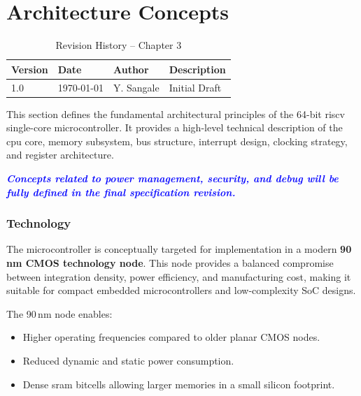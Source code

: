 
\chapter{Architecture Concepts}
\label{chap:architecture_concepts}

\begin{table}[H]
\caption{Revision History – Chapter 3}
\centering
\begin{tabular}{llll}
\toprule
Version & Date & Author & Description \\
\midrule
1.0 & \today & Y. Sangale & Initial Draft \\
\bottomrule
\end{tabular}
\end{table}

This section defines the fundamental architectural principles of the 64-bit \gls{riscv} single-core microcontroller. It provides a high-level technical description of the \gls{cpu} core, memory subsystem, bus structure, interrupt design, clocking strategy, and register architecture. 

\textcolor{blue}{\textbf{\textit{Concepts related to power management, security, and debug will be fully defined in the final specification revision.}}}

\subsection{Technology}

The microcontroller is conceptually targeted for implementation in a modern \textbf{90\,nm CMOS technology node}. 
This node provides a balanced compromise between integration density, power efficiency, and manufacturing cost, 
making it suitable for compact embedded microcontrollers and low-complexity \gls{SoC} designs.

The 90\,nm node enables:
\begin{itemize}
  \item Higher operating frequencies compared to older planar CMOS nodes.
  \item Reduced dynamic and static power consumption.
  \item Dense \gls{sram} bitcells allowing larger memories in a small silicon footprint.
\end{itemize}


